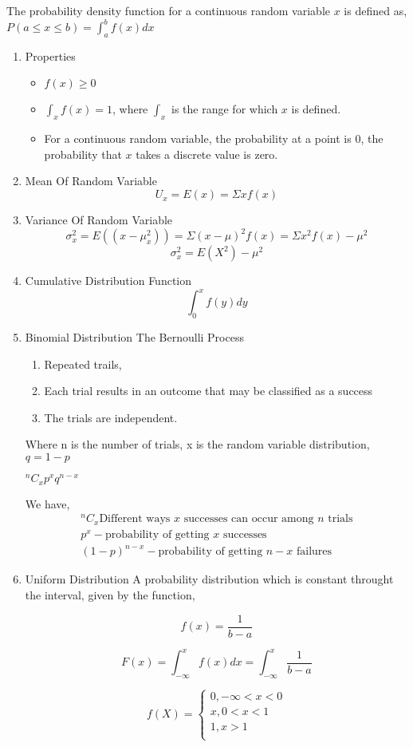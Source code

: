 \documentclass[11pt]{report}
\begin{document}
The probability density function for a continuous random variable \(x\) is defined as, \(P(a \le x \le b) = \int_a^b f(x)dx\)
\begin{enumerate}
\item Properties
\label{sec:org57cd78e}
\begin{itemize}
\item \(f(x) \ge 0\)
\item \(\int_xf(x) = 1\), where \(\int_x\) is the range for which \(x\) is defined.
\item For a continuous random variable, the probability at a point is \(0\), the probability that \(x\) takes a discrete value is zero.
\end{itemize}
\item Mean Of Random Variable
\label{sec:org00414f3}
$$U_x = E(x) = \Sigma x f(x)$$
\item Variance Of Random Variable
\label{sec:orga87b5e2}
$$\sigma_x^{2} = E((x-\mu_{x}^2)) = \Sigma (x-\mu)^2 f(x) = \Sigma x^2f(x) - \mu^{2}$$
$$\sigma_x^{2} = E(X^2) - \mu^2$$
\item Cumulative Distribution Function
\label{sec:org9d3bbda}
$$\int_0^x f(y)dy$$
\item Binomial Distribution
\label{sec:orga02e662}
The Bernoulli Process

\begin{enumerate}
\item Repeated trails,
\item Each trial results in an outcome that may be classified as a success
\item The trials are independent.
\end{enumerate}


Where n is the number of trials, x is the random variable distribution, \(q = 1 - p\)

\(^nC_xp^{x} q^{n-x}\)

We have,
\begin{align*}
^nC_x \text{Different ways $x$ successes can occur among $n$ trials} \\
p^x - \text{probability of getting $x$ successes} \\
(1-p)^{n-x} - \text{probability of getting $n-x$ failures}
\end{align*}
\item Uniform Distribution
\label{sec:org3fec4fa}
A probability distribution which is constant throught the interval, given by the function,

$$f(x) = \frac{1}{b-a}  $$

$$F(x) = \int_{-\infty}^xf(x)dx = \int_{-\infty}^x \frac{1}{b-a}  $$

$$
f(X) =    \begin{cases}
0, - \infty < x < 0 \\
x, 0<x<1 \\
1, x > 1 \\
     \end{cases}
$$
\end{enumerate}
\end{document}
